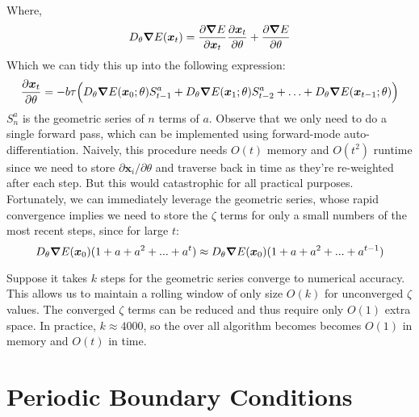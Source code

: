 \documentclass{article}
\begin{document}
Where,
\begin{equation}
D_{\theta} \grad E(\bm{x}_t) = \dfrac{\partial \grad E}{\partial \bm{x}_t} \dfrac{\partial \bm{x}_t} {\partial\theta} + \dfrac{\partial \grad E}{\partial \theta}
\end{equation}
Which we can tidy this up into the following expression:
\begin{equation}
\dfrac {\partial \bm{x}_t}{\partial \theta} = -b  \tau \Big( D_{\theta} \grad E(\bm{x}_0; \theta)S_{t-1}^a + D_{\theta} \grad E(\bm{x}_1;\theta)S_{t-2}^a + \ldots +  D_{\theta} \grad E(\bm{x}_{t-1};\theta) \Big)
\end{equation}
$S_n^a$ is the geometric series of $n$ terms of $a$. Observe that we only need to do a single forward pass, which can be implemented using forward-mode auto-differentiation. Naively, this procedure needs $O(t)$ memory and $O(t^2)$ runtime since we need to store $\partial\bm{x}_i / \partial\theta$ and traverse back in time as they're re-weighted after each step. But this would catastrophic for all practical purposes. Fortunately, we can immediately leverage the geometric series, whose rapid convergence implies we need to store the $\zeta$ terms for only a small numbers of the most recent steps, since for large $t$:
\begin{equation}
D_{\theta} \grad E(\bm{x}_0)(1+a+a^2+...+a^t) \approx D_{\theta} \grad E(\bm{x}_0)(1+a+a^2+...+a^{t-1})
\end{equation}

Suppose it takes $k$ steps for the geometric series converge to numerical accuracy. This allows us to maintain a rolling window of only size $O(k)$ for unconverged $\zeta$ values. The converged $\zeta$ terms can be reduced and thus require only $O(1)$ extra space. In practice, $k \approx 4000$, so the over all algorithm becomes becomes $O(1)$ in memory and $O(t)$ in time. 


\section{Periodic Boundary Conditions}
\end{document}
